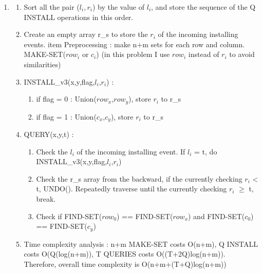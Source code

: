 \documentclass{article}
\begin{document}
\begin{CJK*}{UTF8}{bsmi}
\begin{enumerate}
    \item \begin{enumerate}
        \item Sort all the pair ($l_i,r_i$) by the value of $l_i$, and store the sequence of the Q INSTALL operations in this order.
        \item Create an empty array r\_s to store the $r_i$ of the incoming installing events.
        item Preprocessing : make n+m sets for each row and column. MAKE-SET($row_i$ or $c_i$) (in this problem I use $row_i$ instead of $r_i$ to avoid similarities)
        \item INSTALL\_v3(x,y,flag,$l_i$,$r_i$) : \begin{enumerate}
            \item if flag = 0 : Union($row_x$,$row_y$), store $r_i$ to r\_s
            \item if flag = 1 : Union($c_x$,$c_y$), store $r_i$ to r\_s
        \end{enumerate} 
        \item QUERY(x,y,t) : \begin{enumerate}
            \item Check the $l_i$ of the incoming installing event. If $l_i$  = t, do    INSTALL\_v3(x,y,flag,$l_i$,$r_i$)
            \item Check the r\_s array from the backward, if the currently checking $r_i$ < t, UNDO().
            Repeatedly traverse until the currently checking $r_i$ $\geq$ t, break.
            \item Check if FIND-SET($row_0$) == FIND-SET($row_x$) and FIND-SET($c_0$) == FIND-SET($c_y$)
         \end{enumerate}
         \item Time complexity analysis : n+m MAKE-SET costs O(n+m), Q INSTALL costs O(Q(log(n+m)), T QUERIES costs O((T+2Q)log(n+m)). Therefore, overall time complexity is O(n+m+(T+Q)log(n+m))
    \end{enumerate}
    
\end{enumerate}

\end{CJK*}
\end{document}
